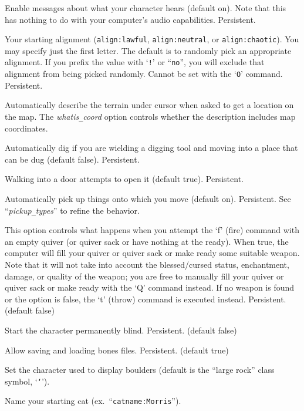 \blist{}
\item[\ib{acoustics}]
Enable messages about what your character hears (default on).
Note that this has nothing to do with your computer's audio capabilities.
Persistent.
\item[\ib{align}]
Your starting alignment ({\tt align:lawful}, {\tt align:neutral},
or {\tt align:chaotic}).  You may specify just the first letter.
The default is to randomly pick an appropriate alignment.
If you prefix the value with `{\tt !}' or ``{\tt no}'', you will
exclude that alignment from being picked randomly.
Cannot be set with the `{\tt O}' command.  Persistent.
\item[\ib{autodescribe}]
Automatically describe the terrain under cursor when asked to get a location
on the map.  The
{\it whatis\verb+_+coord\/}
option controls whether the description includes map coordinates.
\item[\ib{autodig}]
Automatically dig if you are wielding a digging tool and moving into a place
that can be dug (default false).  Persistent.
\item[\ib{autoopen}]
Walking into a door attempts to open it (default true).  Persistent.
\item[\ib{autopickup}]
Automatically pick up things onto which you move (default on).  Persistent.
See ``{\it pickup\verb+_+types\/}'' to refine the behavior.
\item[\ib{autoquiver}]
This option controls what happens when you attempt the `f' (fire)
command with an empty quiver (or quiver sack or have nothing at the ready).
When true, the computer will fill
your quiver or quiver sack or make ready some suitable weapon.  Note that it
will not take
into account the blessed/cursed status, enchantment, damage, or
quality of the weapon; you are free to manually fill your quiver or quiver sack
or make ready
with the `Q' command instead.  If no weapon is found or the option is
false, the `t' (throw) command is executed instead.  Persistent.  (default false)
\item[\ib{blind}]
Start the character permanently blind.  Persistent. (default false)
\item[\ib{bones}]
Allow saving and loading bones files.  Persistent.  (default true)
\item[\ib{boulder}]
Set the character used to display boulders (default is the ``large rock''
class symbol, `{\tt `}').
\item[\ib{catname}]
Name your starting cat (ex.\ ``{\tt catname:Morris}'').
